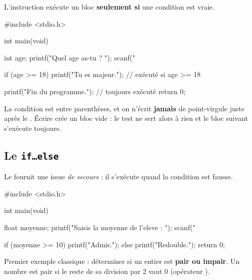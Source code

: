 L'instruction  exécute un bloc \textbf{seulement si} une condition est vraie.

\begin{syntaxe}
\end{syntaxe}

\begin{codec}
#include <stdio.h>

int main(void) {
    int age;
    printf("Quel age as-tu ? ");
    scanf("%

    if (age >= 18) {
        printf("Tu es majeur.\n");   // exécuté si age >= 18
    }

    printf("Fin du programme.\n");   // toujours exécuté
    return 0;
}
\end{codec}


\begin{attention}
La condition est entre parenthèses, et on n'écrit \textbf{jamais} de point-virgule
juste après le \code{)}. Écrire  crée un bloc vide : le test
ne sert alors à rien et le bloc suivant s'exécute toujours.
\end{attention}

\subsection{Le \texttt{if\dots else}}

Le  fournit une issue \emph{de secours} : il s'exécute quand la condition
est fausse.

\begin{syntaxe}
\end{syntaxe}

\begin{codec}
#include <stdio.h>

int main(void) {
    float moyenne;
    printf("Saisis la moyenne de l'eleve : ");
    scanf("%

    if (moyenne >= 10) {
        printf("Admis.\n");
    } else {
        printf("Redouble.\n");
    }
    return 0;
}
\end{codec}

\begin{exemple}
Premier exemple classique : déterminer si un entier est \textbf{pair ou impair}.
Un nombre est pair si le reste de sa division par 2 vaut 0 (opérateur \code{\%}).
\end{exemple}

